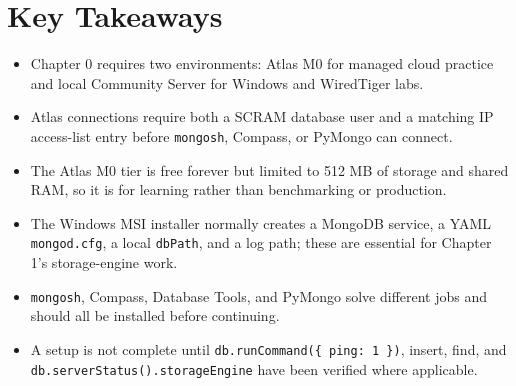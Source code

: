 \section*{Key Takeaways}
\begin{itemize}
    \item Chapter 0 requires two environments: Atlas M0 for managed cloud practice and local Community Server for Windows and WiredTiger labs.
    \item Atlas connections require both a SCRAM database user and a matching IP access-list entry before \texttt{mongosh}, Compass, or PyMongo can connect.
    \item The Atlas M0 tier is free forever but limited to 512 MB of storage and shared RAM, so it is for learning rather than benchmarking or production.
    \item The Windows MSI installer normally creates a MongoDB service, a YAML \texttt{mongod.cfg}, a local \texttt{dbPath}, and a log path; these are essential for Chapter 1's storage-engine work.
    \item \texttt{mongosh}, Compass, Database Tools, and PyMongo solve different jobs and should all be installed before continuing.
    \item A setup is not complete until \texttt{db.runCommand(\{ ping: 1 \})}, insert, find, and \texttt{db.serverStatus().storageEngine} have been verified where applicable.
\end{itemize}

